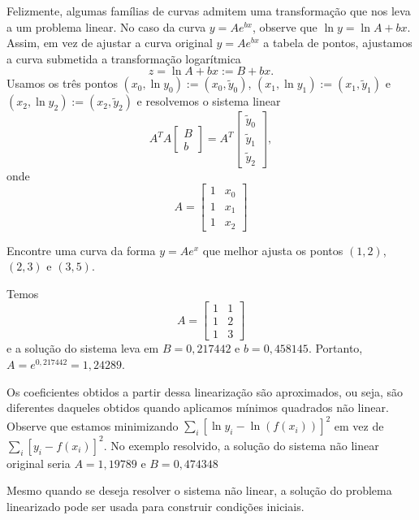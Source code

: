 Felizmente, algumas famílias de curvas admitem uma transformação que nos leva a um problema linear. No caso da curva $y=Ae^{bx}$, observe que $\ln y=\ln A+bx$. Assim, em vez de ajustar a curva original $y=Ae^{bx}$ a tabela de pontos, ajustamos a curva submetida a transformação logarítmica
$$
z=\ln A+bx:=B+bx.
$$
Usamos os três pontos $(x_0,\ln y_0):=(x_0, \tilde{y}_0)$, $(x_1,\ln y_1):=(x_1,\tilde{y}_1)$ e $(x_2,\ln y_2):=(x_2,\tilde{y}_2)$ e resolvemos o sistema linear
$$
A^T A \left[\begin{array}{c} B\\b \end{array}\right]=A^T\left[\begin{array}{c}\tilde{y}_0\\\tilde{y}_1\\\tilde{y}_2 \end{array}\right],
$$
onde
$$
A=\left[\begin{array}{cc} 1&x_0\\1&x_1\\1&x_2 \end{array}\right]
$$
\begin{ex}Encontre uma curva da forma $y=Ae^x$ que melhor ajusta os pontos $(1,2)$, $(2,3)$ e $(3,5)$.
\end{ex}
Temos
$$
A=\left[\begin{array}{cc} 1&1\\1&2\\1&3 \end{array}\right]
$$
e a solução do sistema leva em $B=0,217442$ e $b=0,458145$. Portanto, $A=e^{0,217442}=1,24289$.

\begin{obs}
Os coeficientes obtidos a partir dessa linearização são aproximados, ou seja, são diferentes daqueles obtidos quando aplicamos mínimos quadrados não linear. Observe que estamos minimizando $\displaystyle\sum_i [\ln y_i -\ln (f(x_i))]^2$ em vez de $\displaystyle\sum_i [ y_i -f(x_i)]^2$. No exemplo resolvido, a solução do sistema não linear original seria $A=1,19789$ e $B=0,474348$
\end{obs}

\begin{obs}
Mesmo quando se deseja resolver o sistema não linear, a solução do problema linearizado pode ser usada para construir condições iniciais.
\end{obs}


